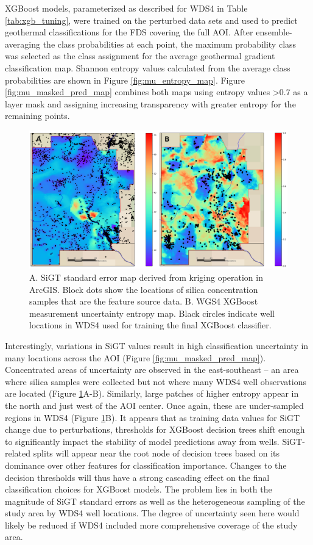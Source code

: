 XGBoost models, parameterized as described for WDS4 in Table \ref{tab:xgb_tuning}, were trained on the perturbed data sets and used to predict geothermal classifications for the FDS covering the full AOI. After ensemble-averaging the class probabilities at each point, the maximum probability class was selected as the class assignment for the average geothermal gradient classification map. Shannon entropy values calculated from the average class probabilities are shown in Figure \ref{fig:mu_entropy_map}. Figure \ref{fig:mu_masked_pred_map} combines both maps using entropy values >0.7 as a layer mask and assigning increasing transparency with greater entropy for the remaining points.
\begin{figure}[!htp]
\centering
\includegraphics[width=\textwidth]{templates/images/Figure-MU_StdErr_vs_Uncert.png}
\caption[SiGT standard error and model entropy]
{A. SiGT standard error map derived from kriging operation in ArcGIS. Block dots show the locations of silica concentration samples that are the feature source data. B. WGS4 XGBoost measurement uncertainty entropy map. Black circles indicate well locations in WDS4 used for training the final XGBoost classifier. }
\label{fig:mu_stderr_entropy}
\end{figure}

Interestingly, variations in SiGT values result in high classification uncertainty in many locations across the AOI (Figure \ref{fig:mu_masked_pred_map}). Concentrated areas of uncertainty are observed in the east-southeast -- an area where silica samples were collected but not where many WDS4 well observations are located (Figure \ref{fig:mu_stderr_entropy}A-B). Similarly, large patches of higher entropy appear in the north and just west of the AOI center. Once again, these are under-sampled regions in WDS4 (Figure \ref{fig:mu_stderr_entropy}B). It appears that as training data values for SiGT change due to perturbations, thresholds for XGBoost decision trees shift enough to significantly impact the stability of model predictions away from wells. SiGT-related splits will appear near the root node of decision trees based on its dominance over other features for classification importance. Changes to the decision thresholds will thus have a strong cascading effect on the final classification choices for XGBoost models. The problem lies in both the magnitude of SiGT standard errors as well as the heterogeneous sampling of the study area by WDS4 well locations. The degree of uncertainty seen here would likely be reduced if WDS4 included more comprehensive coverage of the study area.


